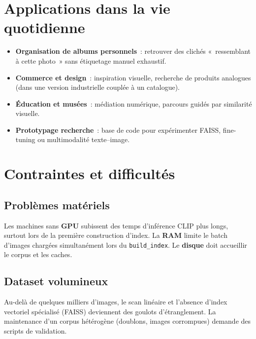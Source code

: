 \documentclass[11pt,a4paper,openany]{report}
\begin{document}
\chapter{Applications dans la vie quotidienne}

\begin{itemize}[leftmargin=*]
  \item \textbf{Organisation de albums personnels}~: retrouver des clichés «~ressemblant à cette photo~» sans étiquetage manuel exhaustif.
  \item \textbf{Commerce et design}~: inspiration visuelle, recherche de produits analogues (dans une version industrielle couplée à un catalogue).
  \item \textbf{Éducation et musées}~: médiation numérique, parcours guidés par similarité visuelle.
  \item \textbf{Prototypage recherche}~: base de code pour expérimenter FAISS, fine-tuning ou multimodalité texte–image.
\end{itemize}

\chapter{Contraintes et difficultés}

\section{Problèmes matériels}

Les machines sans \textbf{GPU} subissent des temps d'inférence CLIP plus longs, surtout lors de la première construction d'index. La \textbf{RAM} limite le batch d'images chargées simultanément lors du \texttt{build\_index}. Le \textbf{disque} doit accueillir le corpus et les caches.

\section{Dataset volumineux}

Au-delà de quelques milliers d'images, le scan linéaire et l'absence d'index vectoriel spécialisé (FAISS) deviennent des goulots d'étranglement. La maintenance d'un corpus hétérogène (doublons, images corrompues) demande des scripts de validation.
\end{document}
